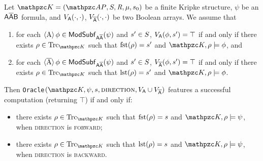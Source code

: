 \begin{lemma}\label{lemmaOracle}
Let $\Ku=\KuDef$ be a finite Kripke structure, $\psi$ be an $\mathsf{A\overline{A}B}$ formula, and $V_{\mathsf{A}}(\cdot,\cdot)$, $V_{\mathsf{\overline{A}}}(\cdot,\cdot)$ be two Boolean arrays. We assume that 
\begin{enumerate}
	\item for each $\operatorname{\langle A\rangle} \phi\in\mathsf{ModSubf}_{\mathsf{A\overline{A}}}(\psi)$ and $s'\in S$, $V_{\mathsf{A}}(\phi,s')=\top$ if and only if there exists $\rho\in\Trk_{\Ku}$ such that $\operatorname{fst}(\rho)=s'$ and $\Ku,\rho\models \phi$, and
	\item for each $\operatorname{\langle \overline{A}\rangle} \phi\in\mathsf{ModSubf}_{\mathsf{A\overline{A}}}(\psi)$ and $s'\in S$, $V_{\mathsf{\overline{A}}}(\phi,s')=\top$ if and only if there exists $\rho\in\Trk_{\Ku}$ such that $\operatorname{lst}(\rho)=s'$ and $\Ku,\rho\models \phi$.
\end{enumerate}
Then \texttt{Oracle}$(\Ku,\psi,s,\textsc{direction},V_{\A}\cup V_{\Abar})$ features a successful computation (returning $\top$) if and only if:
\begin{itemize}
	\item there exists $\rho\in\Trk_{\Ku}$ such that $\operatorname{fst}(\rho)=s$ and $\Ku,\rho\models \psi$, when \textsc{direction} is \textsc{forward};
	\item there exists $\rho\in\Trk_{\Ku}$ such that $\operatorname{lst}(\rho)=s$ and $\Ku,\rho\models \psi$, when \textsc{direction} is \textsc{backward}.
\end{itemize}
\end{lemma}



